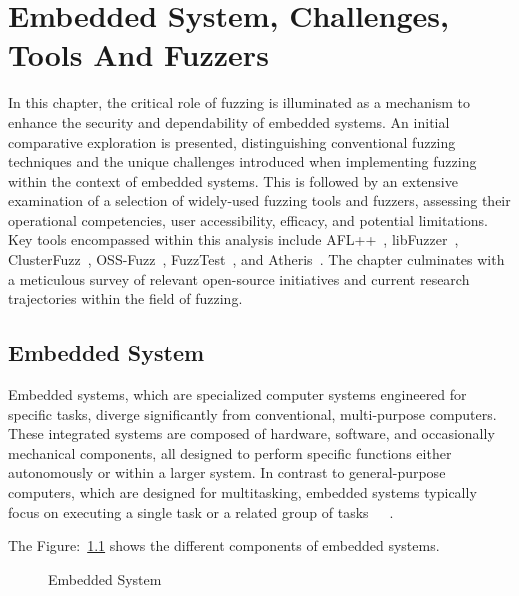 \vspace{21.5pt}
\chapter{Embedded System, Challenges, Tools And Fuzzers}\label{sec:embedded_system}
In this chapter, the critical role of fuzzing is illuminated as a mechanism to
enhance the security and dependability of embedded systems. An initial
comparative exploration is presented, distinguishing conventional fuzzing
techniques and the unique challenges introduced when implementing fuzzing
within the context of embedded systems. This is followed by an extensive
examination of a selection of widely-used fuzzing tools and fuzzers,
assessing their operational competencies, user accessibility, efficacy, and
potential limitations. Key tools encompassed within this analysis include
AFL++~\cite{257204}, libFuzzer~\cite{libFuzze17:online}, ClusterFuzz~\cite{ClusterF90:online},
OSS-Fuzz~\cite{GitHubgo49:online}, FuzzTest~\cite{GitHubgo59:online}, and Atheris~\cite{atheris2020}. The chapter culminates with a meticulous
survey of relevant open-source initiatives and current research trajectories
within the field of fuzzing.

\section{Embedded System}

Embedded systems, which are specialized computer systems engineered for specific
tasks, diverge significantly from conventional, multi-purpose computers. These
integrated systems are composed of hardware, software, and occasionally
mechanical components, all designed to perform specific functions either
autonomously or within a larger system. In contrast to general-purpose computers,
which are designed for multitasking, embedded systems typically focus on
executing a single task or a related group of
tasks~\cite{marwedel2021embedded}~\cite{yun2022fuzzing}~\cite{Introduc26:online}.

The Figure:~\ref{fig:Embedded_System} shows the different components of embedded systems.

\begin{figure}[h]
        \centering
        \caption{Embedded System~\cite{Introduc82:online}}\label{fig:Embedded_System}
\end{figure}


